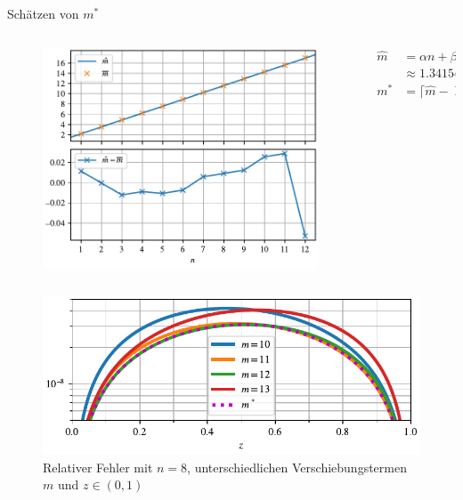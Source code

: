 \begin{frame}{Schätzen von $m^*$}
\begin{columns}
\begin{column}{0.65\textwidth}
\begin{figure}
\centering
\vspace{-12pt}
\includegraphics[width=1.0\textwidth]{../images/estimates.pdf}
\end{figure}
\end{column}
\begin{column}{0.34\textwidth}
\begin{align*}
\hat{m}
&=
\alpha n + \beta
\\
&\approx
1.34154 n + 0.848786
\\
m^*
&=
\lceil \hat{m} - \operatorname{Re}z \rceil
\end{align*}
\end{column}
\end{columns}

\end{frame}

\begin{frame}{}
\begin{figure}[h]
\centering
\includegraphics{../images/rel_error_shifted.pdf}
\caption{Relativer Fehler mit $n=8$, unterschiedlichen Verschiebungstermen $m$ und $z\in(0, 1)$}
\end{figure}
\end{frame}

